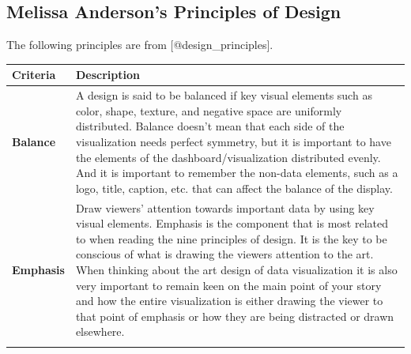 \documentclass[]{book}
\theoremstyle{definition}
\theoremstyle{definition}
\theoremstyle{definition}
\theoremstyle{remark}
\begin{document}
\subsection{Melissa Anderson's Principles of
Design}\label{melissa-andersons-principles-of-design}

The following principles are from {[}@design\_principles{]}.

\begin{longtable}[]{@{}ll@{}}
\toprule
\begin{minipage}[b]{0.16\columnwidth}\raggedright\strut
\textbf{Criteria}\strut
\end{minipage} & \begin{minipage}[b]{0.78\columnwidth}\raggedright\strut
\textbf{Description}\strut
\end{minipage}\tabularnewline
\midrule
\endhead
\begin{minipage}[t]{0.16\columnwidth}\raggedright\strut
\textbf{Balance}\strut
\end{minipage} & \begin{minipage}[t]{0.78\columnwidth}\raggedright\strut
A design is said to be balanced if key visual elements such as color,
shape, texture, and negative space are uniformly distributed. Balance
doesn't mean that each side of the visualization needs perfect symmetry,
but it is important to have the elements of the dashboard/visualization
distributed evenly. And it is important to remember the non-data
elements, such as a logo, title, caption, etc. that can affect the
balance of the display.\strut
\end{minipage}\tabularnewline
\begin{minipage}[t]{0.16\columnwidth}\raggedright\strut
\textbf{Emphasis}\strut
\end{minipage} & \begin{minipage}[t]{0.78\columnwidth}\raggedright\strut
Draw viewers' attention towards important data by using key visual
elements. Emphasis is the component that is most related to when reading
the nine principles of design. It is the key to be conscious of what is
drawing the viewers attention to the art. When thinking about the art
design of data visualization it is also very important to remain keen on
the main point of your story and how the entire visualization is either
drawing the viewer to that point of emphasis or how they are being
distracted or drawn elsewhere.\strut
\end{minipage}\tabularnewline
\begin{minipage}[t]{0.16\columnwidth}\raggedright\strut

\end{minipage}
\end{longtable}
\end{document}
